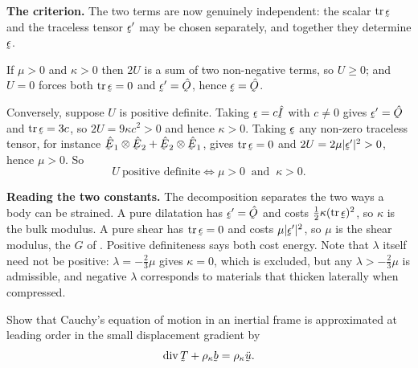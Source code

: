 \begin{solution}
\textbf{The criterion.} The two terms are now genuinely independent: the
scalar $\tr\vek{\epsilon}$ and the traceless tensor $\vek{\epsilon}'$
may be chosen separately, and together they determine
$\vek{\epsilon}$.

If $\mu>0$ and $\kappa>0$ then $2U$ is a sum of two non-negative terms,
so $U\ge0$; and $U=0$ forces both $\tr\vek{\epsilon}=0$ and
$\vek{\epsilon}'=\hOb$, hence $\vek{\epsilon}=\hOb$.

Conversely, suppose $U$ is positive definite. Taking
$\vek{\epsilon}=c\hI$ with $c\neq0$ gives $\vek{\epsilon}'=\hOb$ and
$\tr\vek{\epsilon}=3c$, so $2U=9\kappa c^{2}>0$ and hence $\kappa>0$.
Taking $\vek{\epsilon}$ any non-zero traceless tensor, for instance
$\hbE_{1}\otimes\hbE_{2}+\hbE_{2}\otimes\hbE_{1}$, gives
$\tr\vek{\epsilon}=0$ and $2U=2\mu|\vek{\epsilon}'|^{2}>0$, hence
$\mu>0$. So
\[
   U\ \text{positive definite}\iff \mu>0\ \text{ and }\ \kappa>0 .
\]

\textbf{Reading the two constants.} The decomposition separates the two
ways a body can be strained. A pure dilatation has
$\vek{\epsilon}'=\hOb$ and costs $\tfrac12\kappa(\tr\vek{\epsilon})^{2}$,
so $\kappa$ is the bulk modulus. A pure shear has $\tr\vek{\epsilon}=0$
and costs $\mu|\vek{\epsilon}'|^{2}$, so $\mu$ is the shear modulus,
the $G$ of . Positive definiteness says both cost energy.
Note that $\lambda$ itself need not be positive: $\lambda=-\tfrac23\mu$
gives $\kappa=0$, which is excluded, but any $\lambda>-\tfrac23\mu$ is
admissible, and negative $\lambda$ corresponds to materials that
thicken laterally when compressed.
\end{solution}

\begin{problem}
Show that Cauchy's equation of motion in an inertial frame is
approximated at leading order in the small displacement gradient by
\[
   \dvg\bT+\rho_{\kappa}\bb=\rho_{\kappa}\ddot\bu .
\]
\end{problem}

